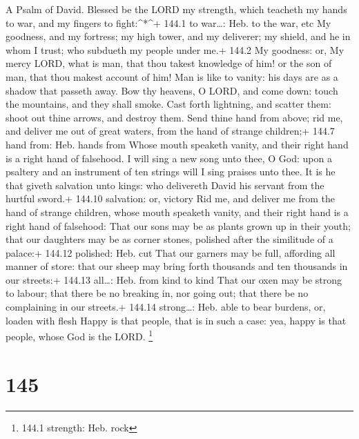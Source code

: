 A Psalm of David.  Blessed be the LORD my strength, which
teacheth my hands to war, and my fingers to fight:\^{}*\^{}+ 144.1 to
war\ldots: Heb. to the war, etc  My goodness, and my
fortress; my high tower, and my deliverer; my shield, and he in whom I
trust; who subdueth my people under me.+ 144.2 My goodness: or, My mercy
 LORD, what is man, that thou takest knowledge of him! or
the son of man, that thou makest account of him!  Man is
like to vanity: his days are as a shadow that passeth away. 
Bow thy heavens, O LORD, and come down: touch the mountains, and they
shall smoke.  Cast forth lightning, and scatter them: shoot
out thine arrows, and destroy them.  Send thine hand from
above; rid me, and deliver me out of great waters, from the hand of
strange children;+ 144.7 hand from: Heb. hands from  Whose
mouth speaketh vanity, and their right hand is a right hand of
falsehood.  I will sing a new song unto thee, O God: upon a
psaltery and an instrument of ten strings will I sing praises unto thee.
 It is he that giveth salvation unto kings: who delivereth
David his servant from the hurtful sword.+ 144.10 salvation: or, victory
 Rid me, and deliver me from the hand of strange children,
whose mouth speaketh vanity, and their right hand is a right hand of
falsehood:  That our sons may be as plants grown up in
their youth; that our daughters may be as corner stones, polished after
the similitude of a palace:+ 144.12 polished: Heb. cut 
That our garners may be full, affording all manner of store: that our
sheep may bring forth thousands and ten thousands in our streets:+
144.13 all\ldots: Heb. from kind to kind  That our oxen may
be strong to labour; that there be no breaking in, nor going out; that
there be no complaining in our streets.+ 144.14 strong\ldots: Heb. able
to bear burdens, or, loaden with flesh  Happy is that
people, that is in such a case: yea, happy is that people, whose God is
the LORD. \footnote{144.1 strength: Heb. rock}

\hypertarget{section-145}{%
\section{145}\label{section-145}}


